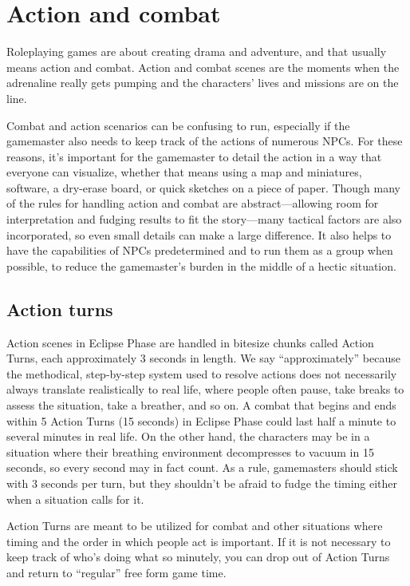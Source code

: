 
\chapter{Action and combat}
\label{chap:action-combat}

Roleplaying games are about creating drama and adventure, and that usually means action and combat. Action and combat scenes are the moments when the adrenaline really gets pumping and the characters’ lives and missions are on the line.

Combat and action scenarios can be confusing to run, especially if the gamemaster also needs to keep track of the actions of numerous NPCs. For these reasons, it’s important for the gamemaster to detail the action in a way that everyone can visualize, whether that means using a map and miniatures, software, a dry-erase board, or quick sketches on a piece of paper. Though many of the rules for handling action and combat are abstract—allowing room for interpretation and fudging results to fit the story—many tactical factors are also incorporated, so even small details can make a large difference. It also helps to have the capabilities of NPCs predetermined and to run them as a group when possible, to reduce the gamemaster’s burden in the middle of a hectic situation.


\section{Action turns}
\label{sec:action-turns}

Action scenes in Eclipse Phase are handled in bitesize chunks called Action Turns, each approximately 3 seconds in length. We say ``approximately''  because the methodical, step-by-step system used to resolve actions does not necessarily always translate realistically to real life, where people often pause, take breaks to assess the situation, take a breather, and so on. A combat that begins and ends within 5 Action Turns (15 seconds) in Eclipse Phase could last half a minute to several minutes in real life. On the other hand, the characters may be in a situation where their breathing environment decompresses to vacuum in 15 seconds, so every second may in fact count. As a rule, gamemasters should stick with 3 seconds per turn, but they shouldn’t be afraid to fudge the timing either when a situation calls for it.

Action Turns are meant to be utilized for combat and other situations where timing and the order in which people act is important. If it is not necessary to keep track of who’s doing what so minutely, you can drop out of Action Turns and return to ``regular''  free form game time.

